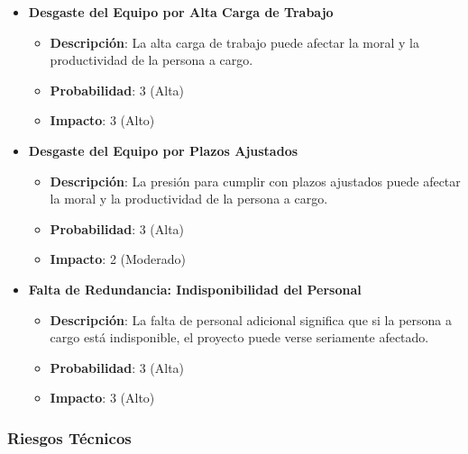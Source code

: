 \documentclass{article}
\begin{document}
\begin{itemize}
    \item \textbf{Desgaste del Equipo por Alta Carga de Trabajo}
          \begin{itemize}
              \item \textbf{Descripción}: La alta carga de trabajo puede afectar la moral y la productividad de la persona a cargo.
              \item \textbf{Probabilidad}: 3 (Alta)
              \item \textbf{Impacto}: 3 (Alto)
          \end{itemize}

    \item \textbf{Desgaste del Equipo por Plazos Ajustados}
          \begin{itemize}
              \item \textbf{Descripción}: La presión para cumplir con plazos ajustados puede afectar la moral y la productividad de la persona a cargo.
              \item \textbf{Probabilidad}: 3 (Alta)
              \item \textbf{Impacto}: 2 (Moderado)
          \end{itemize}

    \item \textbf{Falta de Redundancia: Indisponibilidad del Personal}
          \begin{itemize}
              \item \textbf{Descripción}: La falta de personal adicional significa que si la persona a cargo está indisponible, el proyecto puede verse seriamente afectado.
              \item \textbf{Probabilidad}: 3 (Alta)
              \item \textbf{Impacto}: 3 (Alto)
          \end{itemize}
\end{itemize}

\subsubsection{Riesgos Técnicos}
\end{document}
